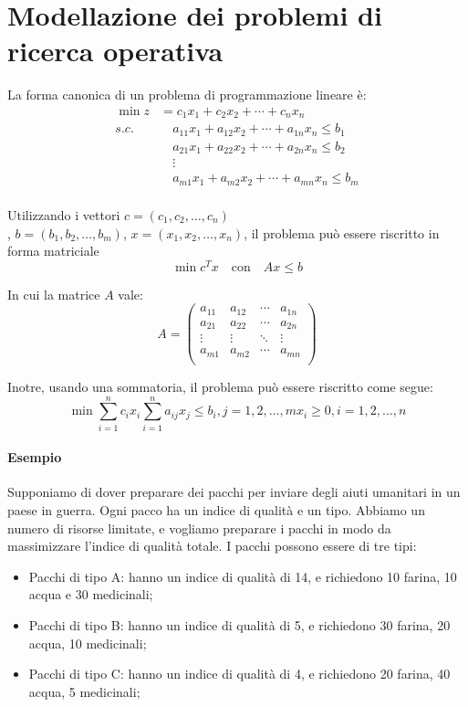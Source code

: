 \documentclass{article}
\begin{document}
\section{Modellazione dei problemi di ricerca operativa}

La forma canonica di un problema di programmazione lineare è:
\begin{align*}
  \min z &= c_1x_1 + c_2x_2 + \cdots + c_n x_n\\
  s.c. &\quad a_{11}x_1 + a_{12}x_2 + \cdots + a_{1n}x_n \leq b_1\\
  &\quad a_{21}x_1 + a_{22}x_2 + \cdots + a_{2n}x_n \leq b_2\\
  &\quad \vdots\\
  &\quad a_{m1}x_1 + a_{m2}x_2 + \cdots + a_{mn}x_n \leq b_m\\
\end{align*}

Utilizzando i vettori $c = (c_1, c_2, \ldots, c_n)$\\, 
$b = (b_1, b_2, \ldots, b_m)$, $x = (x_1, x_2, \ldots, x_n)$,
il problema può essere riscritto in forma matriciale
\begin{equation}
  \min c^T x \quad \text{con} \quad Ax \leq b
\end{equation}

In cui la matrice $A$ vale:
\begin{equation}
  A = \begin{pmatrix}
    a_{11} & a_{12} & \cdots & a_{1n}\\
    a_{21} & a_{22} & \cdots & a_{2n}\\
    \vdots & \vdots & \ddots & \vdots\\
    a_{m1} & a_{m2} & \cdots & a_{mn}\\
  \end{pmatrix}
\end{equation}


Inotre, usando una sommatoria, il problema può essere riscritto come segue:
\begin{equation}
  \min \sum_{i=1}^n c_i x_i
  \sum_{i=1}^n a_{ij}x_j \leq b_i, j=1,2,\ldots,m
  x_i \geq 0, i=1,2,\ldots,n
\end{equation}

\paragraph{Esempio}
Supponiamo di dover preparare dei pacchi per inviare degli aiuti umanitari in 
un paese in guerra.
Ogni pacco ha un indice di qualità e un tipo. Abbiamo un numero di risorse
limitate, e vogliamo
preparare i pacchi in modo da massimizzare l'indice di qualità totale. 
I pacchi possono essere di tre tipi:
\begin{itemize}
\item Pacchi di tipo A: hanno un indice di qualità di 14, e richiedono 10 farina,
  10 acqua e 30 medicinali;
\item Pacchi di tipo B: hanno un indice di qualità di 5, e richiedono 30 farina,
  20 acqua, 10 medicinali;
\item Pacchi di tipo C: hanno un indice di qualità di 4, e richiedono 20 farina,
  40 acqua, 5 medicinali;
\end{itemize}
\end{document}
